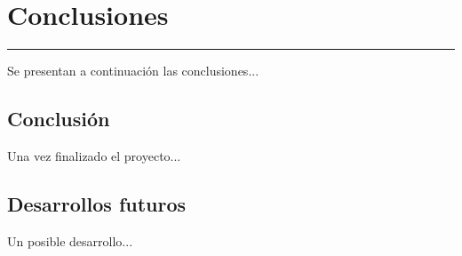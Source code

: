 \chapter{Conclusiones} \label{chap:Conclusiones}
\hrule
\vspace{3mm}

Se presentan a continuación las conclusiones...

\section{Conclusión} \label{sec:Conclusiones:Conclusion}

Una vez finalizado el proyecto...

\section{Desarrollos futuros} \label{sec:Conclusiones:Desarrollos_futuros}

Un posible desarrollo...
